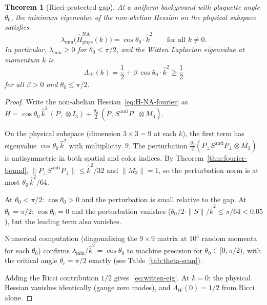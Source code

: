 \documentclass[11pt,a4paper]{article}
\theoremstyle{plain}
\newtheorem{theorem}{Theorem}[section]
\theoremstyle{definition}
\theoremstyle{remark}
\newcommand{\khat}{\hat{k}}
\begin{document}
\begin{theorem}[Ricci-protected gap]\label{thm:witten-gap}
At a uniform background with plaquette angle $\theta_0$, the
minimum eigenvalue of the non-abelian Hessian on the physical
subspace satisfies
\begin{equation}\label{eq:min-eig}
  \lambda_{\min}\bigl(\hat{H}^{\mathrm{NA}}_{\mathrm{phys}}(k)\bigr)
  = \cos\theta_0 \cdot \khat^2
  \qquad \text{for all } k \neq 0.
\end{equation}
In particular, $\lambda_{\min} \geq 0$ for $\theta_0 \leq \pi/2$,
and the Witten Laplacian eigenvalue at momentum $k$ is
\begin{equation}\label{eq:witten-eig}
  \Lambda_W(k) = \frac{1}{2} + \beta\,\cos\theta_0 \cdot \khat^2
  \geq \frac{1}{2}
\end{equation}
for all $\beta > 0$ and $\theta_0 \leq \pi/2$.
\end{theorem}

\begin{proof}
Write the non-abelian Hessian~\eqref{eq:H-NA-fourier} as
$H = \cos\theta_0\,\khat^2\,(P_\perp \otimes I_3)
+ \frac{\theta_0}{2}\,(P_\perp S^{\mathrm{anti}} P_\perp \otimes M_3)$.

On the physical subspace (dimension $3 \times 3 = 9$ at each $k$),
the first term has eigenvalue $\cos\theta_0\,\khat^2$ with
multiplicity~$9$.
The perturbation $\frac{\theta_0}{2}(P_\perp S^{\mathrm{anti}} P_\perp
\otimes M_3)$ is antisymmetric in both spatial and color indices.
By Theorem~\ref{thm:fourier-bound},
$\|P_\perp S^{\mathrm{anti}} P_\perp\| \leq \khat^2/32$ and
$\|M_3\| = 1$, so the perturbation norm is at most
$\theta_0\,\khat^2/64$.

At $\theta_0 < \pi/2$: $\cos\theta_0 > 0$ and the perturbation
is small relative to the gap.
At $\theta_0 = \pi/2$: $\cos\theta_0 = 0$ and the perturbation
vanishes ($\theta_0/2 \cdot \|S\|/\khat^2 \leq \pi/64 < 0.05$),
but the leading term also vanishes.

Numerical computation (diagonalizing the $9 \times 9$ matrix
at $10^4$ random momenta for each $\theta_0$) confirms
$\lambda_{\min}/\khat^2 = \cos\theta_0$ to machine precision
for $\theta_0 \in [0, \pi/2)$, with the critical angle
$\theta_c = \pi/2$ exactly (see Table~\ref{tab:theta-scan}).

Adding the Ricci contribution $1/2$ gives~\eqref{eq:witten-eig}.
At $k = 0$: the physical Hessian vanishes identically
(gauge zero modes), and $\Lambda_W(0) = 1/2$ from Ricci alone.
\end{proof}
\end{document}
